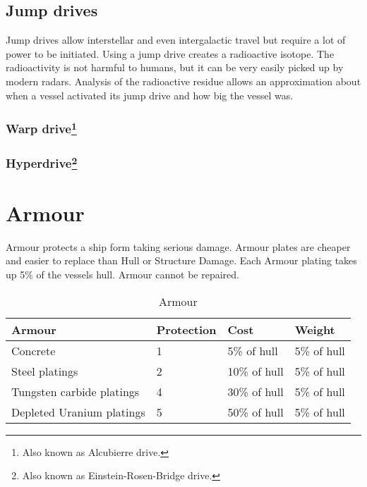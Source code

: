 \subsection{Jump drives}

Jump drives allow interstellar and even intergalactic travel but require a lot of power to be initiated. Using a jump drive creates a radioactive isotope. The radioactivity is not harmful to humans, but it can be very easily picked up by modern radars. Analysis of the radioactive residue allows an approximation about when a vessel activated its jump drive and how big the vessel was.

\subsubsection[Warp drive]{Warp drive\footnote{Also known as Alcubierre drive.}}

\subsubsection[Hyperdrive]{Hyperdrive\footnote{Also known as Einstein-Rosen-Bridge drive.}}

\section{Armour}
\label{sec:Armour}

Armour protects a ship form taking serious damage. Armour plates are cheaper and easier to replace than Hull or Structure Damage. Each Armour plating takes up 5\% of the vessels hull. Armour cannot be repaired.

\begin{table}[H]
  \centering
  \caption{Armour}
  \label{tab:vessel-armour}
  \begin{tabular}{|l|l|l|l|}
    \hline
    Armour                    & Protection & Cost         & Weight      \\  \hline
    Concrete                  & 1          & 5\% of hull  & 5\% of hull \\ \hline
    Steel platings            & 2          & 10\% of hull & 5\% of hull \\ \hline
    Tungsten carbide platings & 4          & 30\% of hull & 5\% of hull \\ \hline
    Depleted Uranium platings & 5          & 50\% of hull & 5\% of hull \\ \hline
  \end{tabular}
\end{table}


